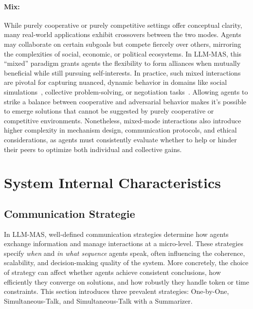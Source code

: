 \paragraph{Mix:}While purely cooperative or purely competitive settings offer conceptual clarity, many real-world applications exhibit crossovers between the two modes. Agents may collaborate on certain subgoals but compete fiercely over others, mirroring the complexities of social, economic, or political ecosystems. In LLM-MAS, this “mixed” paradigm grants agents the flexibility to form alliances when mutually beneficial while still pursuing self-interests. In practice, such mixed interactions are pivotal for capturing nuanced, dynamic behavior in domains like social simulations~\cite{community_knowledge_flooding,sct_society}, collective problem-solving, or negotiation tasks~\cite{polca_mas_for_political,richeliey_diplomacy_society}. Allowing agents to strike a balance between cooperative and adversarial behavior makes it's possible to emerge solutions that cannot be suggested by purely cooperative or competitive environments. Nonetheless, mixed-mode interactions also introduce higher complexity in mechanism design, communication protocols, and ethical considerations, as agents must consistently evaluate whether to help or hinder their peers to optimize both individual and collective gains.

\section{System Internal Characteristics}
\subsection{Communication Strategie}
In LLM-MAS, well-defined communication strategies determine how agents exchange information and manage interactions at a micro-level. These strategies specify \emph{when} and \emph{in what sequence} agents speak, often influencing the coherence, scalability, and decision-making quality of the system. More concretely, the choice of strategy can affect whether agents achieve consistent conclusions, how efficiently they converge on solutions, and how robustly they handle token or time constraints. This section introduces three prevalent strategies: One-by-One, Simultaneous-Talk, and Simultaneous-Talk with a Summarizer.

